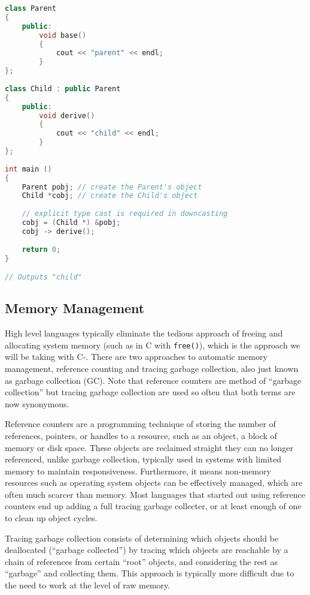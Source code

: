 \begin{lstlisting}[language=C++]
class Parent  
{  
    public:  
        void base()  
        {  
            cout << "parent" << endl;   
        }  
};  
  
class Child : public Parent  
{  
    public:  
        void derive()  
        {  
            cout << "child" << endl;  
        }  
};  
  
int main ()  
{  
    Parent pobj; // create the Parent's object
    Child *cobj; // create the Child's object  
      
    // explicit type cast is required in downcasting  
    cobj = (Child *) &pobj;  
    cobj -> derive();  
      
    return 0;  
}  

// Outputs "child"
\end{lstlisting}

\subsection{Memory Management}

High level languages typically eliminate the tedious approach of freeing and allocating system memory (such as in C with \verb+free()+), which is the approach we will be taking with C-. There are two approaches to automatic memory management, reference counting and tracing garbage collection, also just known as garbage collection (\acs{GC}). Note that reference counters are method of ``garbage collection'' but tracing garbage collection are used so often that both terms are now synonymous.

Reference counters are a programming technique of storing the number of references, pointers, or handles to a resource, such as an object, a block of memory or disk space. These objects are reclaimed straight they can no longer referenced, unlike garbage collection, typically used in systems with limited memory to maintain responsiveness. Furthermore, it means non-memory resources such as operating system objects can be effectively managed, which are often much scarcer than memory. Most languages that started out using reference counters end up adding a full tracing garbage collecter, or at least enough of one to clean up object cycles. 

Tracing garbage collection consists of determining which objects should be deallocated (``garbage collected'') by tracing which objects are reachable by a chain of references from certain ``root'' objects, and considering the rest as ``garbage'' and collecting them. This approach is typically more difficult due to the need to work at the level of raw memory.

